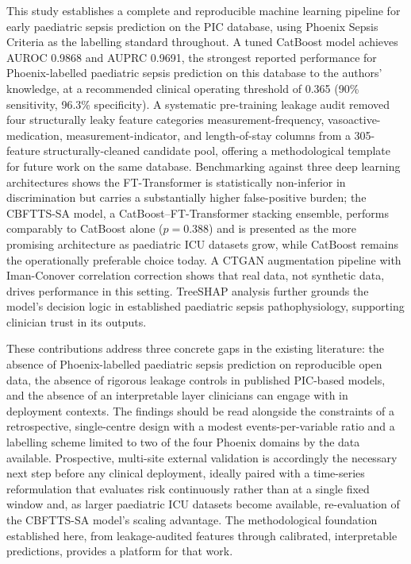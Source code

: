 \documentclass[final,3p,times]{elsarticle}
\begin{document}
This study establishes a complete and reproducible machine learning
pipeline for early paediatric sepsis prediction on the PIC database, using
Phoenix Sepsis Criteria as the labelling standard throughout. A tuned
CatBoost model achieves AUROC 0.9868 and AUPRC 0.9691, the strongest
reported performance for Phoenix-labelled paediatric sepsis prediction on
this database to the authors' knowledge, at a recommended clinical
operating threshold of 0.365 (90\% sensitivity, 96.3\% specificity). A
systematic pre-training leakage audit removed four structurally leaky
feature categories measurement-frequency, vasoactive-medication,
measurement-indicator, and length-of-stay columns from a
305-feature structurally-cleaned candidate pool, offering a
methodological template
for future work on the same database. Benchmarking against three deep
learning architectures shows the FT-Transformer is statistically
non-inferior in discrimination but carries a substantially higher
false-positive burden; the CBFTTS-SA model, a CatBoost--FT-Transformer stacking
ensemble, performs comparably to CatBoost alone ($p = 0.388$) and is
presented as the more promising architecture as paediatric ICU datasets
grow, while CatBoost remains the operationally preferable choice today. A
CTGAN augmentation pipeline with Iman-Conover correlation correction shows
that real data, not synthetic data, drives performance in this setting.
TreeSHAP analysis further grounds the model's decision logic in
established paediatric sepsis pathophysiology, supporting clinician trust
in its outputs.

These contributions address three concrete gaps in the existing
literature: the absence of Phoenix-labelled paediatric sepsis prediction
on reproducible open data, the absence of rigorous leakage controls in
published PIC-based models, and the absence of an interpretable layer
clinicians can engage with in deployment contexts. The findings should be
read alongside the constraints of a retrospective, single-centre design
with a modest events-per-variable ratio and a labelling scheme limited to
two of the four Phoenix domains by the data available. Prospective,
multi-site external validation is accordingly the necessary next step
before any clinical deployment, ideally paired with a time-series
reformulation that evaluates risk continuously rather than at a single
fixed window and, as larger paediatric ICU datasets become available,
re-evaluation of the CBFTTS-SA model's scaling advantage. The methodological
foundation established here, from leakage-audited features through
calibrated, interpretable predictions, provides a platform for that work.
\end{document}
